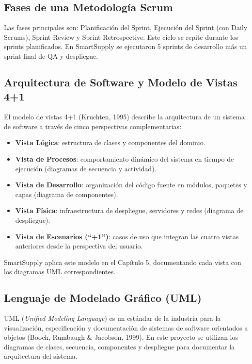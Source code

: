 \documentclass[12pt, a4paper]{report}
\begin{document}
\subsection{Fases de una Metodología Scrum}

Las fases principales son: Planificación del Sprint, Ejecución del Sprint (con Daily Scrums),
Sprint Review y Sprint Retrospective. Este ciclo se repite durante los sprints planificados.
En SmartSupply se ejecutaron 5 sprints de desarrollo más un sprint final de QA y despliegue.

\subsection{Arquitectura de Software y Modelo de Vistas 4+1}

El modelo de vistas 4+1 (Kruchten, 1995) describe la arquitectura de un sistema de
software a través de cinco perspectivas complementarias:

\begin{itemize}
  \item \textbf{Vista Lógica}: estructura de clases y componentes del dominio.
  \item \textbf{Vista de Procesos}: comportamiento dinámico del sistema en tiempo de
        ejecución (diagramas de secuencia y actividad).
  \item \textbf{Vista de Desarrollo}: organización del código fuente en módulos,
        paquetes y capas (diagrama de componentes).
  \item \textbf{Vista Física}: infraestructura de despliegue, servidores y redes
        (diagrama de despliegue).
  \item \textbf{Vista de Escenarios (``+1'')}: casos de uso que integran las cuatro
        vistas anteriores desde la perspectiva del usuario.
\end{itemize}

SmartSupply aplica este modelo en el Capítulo 5, documentando cada vista con los
diagramas UML correspondientes.

\subsection{Lenguaje de Modelado Gráfico (UML)}

UML (\textit{Unified Modeling Language}) es un estándar de la industria para la
visualización, especificación y documentación de sistemas de software orientados a
objetos (Booch, Rumbaugh \& Jacobson, 1999). En este proyecto se utilizan los
diagramas de clases, secuencia, componentes y despliegue para documentar la
arquitectura del sistema.
\end{document}
